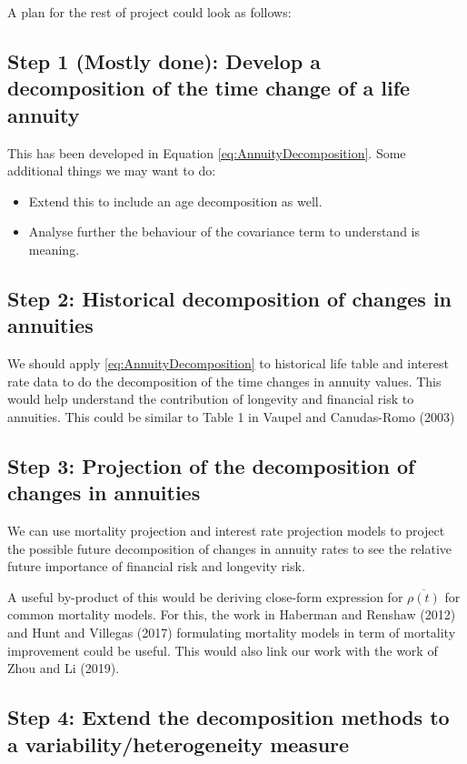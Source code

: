 \documentclass[12pt]{article}
\begin{document}
A plan for the rest of project could look as follows:


\subsection{Step 1 (Mostly done): Develop a decomposition of the time
change of a life
annuity}

This has been developed in Equation \eqref{eq:AnnuityDecomposition}.
Some additional things we may want to do:

\begin{itemize}

\item
  Extend this to include an age decomposition as well.
\item
  Analyse further the behaviour of the covariance term to understand is
  meaning.
\end{itemize}


\subsection{Step 2: Historical decomposition of changes in
annuities}

We should apply \eqref{eq:AnnuityDecomposition} to historical life table
and interest rate data to do the decomposition of the time changes in
annuity values. This would help understand the contribution of longevity
and financial risk to annuities. This could be similar to Table 1 in
Vaupel and Canudas-Romo (2003)


\subsection{Step 3: Projection of the decomposition of changes in
annuities}

We can use mortality projection and interest rate projection models to
project the possible future decomposition of changes in annuity rates to
see the relative future importance of financial risk and longevity risk.

A useful by-product of this would be deriving close-form expression for
\(\overline{\rho(t)}\) for common mortality models. For this, the work
in Haberman and Renshaw (2012) and Hunt and Villegas (2017) formulating
mortality models in term of mortality improvement could be useful. This
would also link our work with the work of Zhou and Li (2019).


\subsection{Step 4: Extend the decomposition methods to a
variability/heterogeneity
measure}
\end{document}
